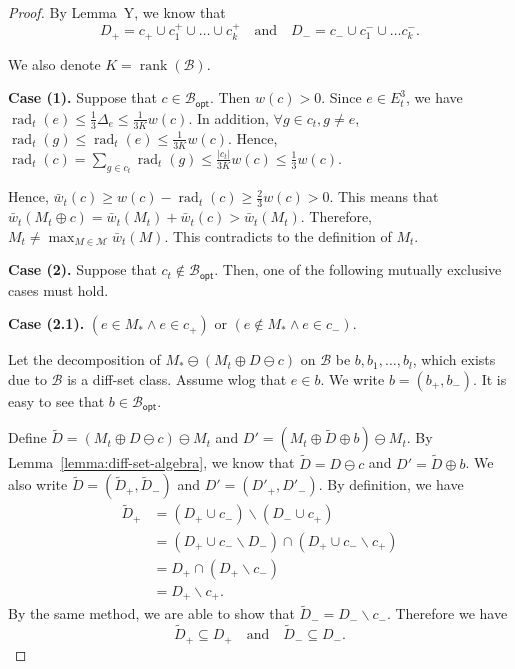 \documentclass{article}
\newcommand{\M}{\mathcal M}
\newcommand{\B}{\mathcal B}
\newcommand{\del}{\backslash}
\newcommand{\Bopt}{\mathcal B_{\mathsf{opt}}}
\DeclareMathOperator{\rank}{rank}
\DeclareMathOperator{\rad}{rad}
\begin{document}
\begin{spacing}{1.1}
\begin{proof}
By Lemma~Y, we know that 
\begin{equation}
	\label{eq:lemma-key-1}
	D_+ = c_+\cup c_1^+ \cup \ldots \cup c_k^+\quad \text{and}\quad D_- = c_-\cup c_1^-\cup \ldots c_k^-.
\end{equation}

We also denote $K=\rank(\B)$.


\textbf{Case (1).} 
Suppose that $c \in\Bopt$. Then $w(c)>0$.
Since $e\in E_t^3$, we have $\rad_t(e) \le \frac{1}{3}\Delta_e \le \frac{1}{3K}w(c)$.
In addition, $\forall g\in c_t, g\not=e$, $\rad_t(g) \le \rad_t(e)\le \frac{1}{3K}w(c)$.
Hence, $\rad_t(c) = \sum_{g\in c_t} \rad_t(g) \le \frac{|c_t|}{3K}w(c) \le \frac{1}{3}w(c)$.

Hence, $\bar w_t(c) \ge w(c)-\rad_t(c) \ge \frac{2}{3}w(c) > 0$.
This means that $\bar w_t(M_t \oplus c) = \bar w_t(M_t)+\bar w_t(c) > \bar w_t(M_t)$.
Therefore, $M_t \not= \max_{M\in \M} \bar w_t(M)$.
This contradicts to the definition of $M_t$.

\textbf{Case (2).} 
Suppose that $c_t\not\in \Bopt$. Then, one of the following mutually exclusive cases must hold.

\textbf{Case (2.1).} 
$(e \in M_* \wedge e\in c_+)$ or $(e \not \in M_* \wedge e\in c_-)$. 
 
Let the decomposition of $M_* \ominus (M_t \oplus D \ominus c)$ on $\B$ be $b,b_1,\ldots,b_l$, which exists due to $\B$ is a diff-set class. 
Assume wlog that $e\in b$. 
We write $b=(b_+,b_-)$.
It is easy to see that $b \in \Bopt$. 

Define $\tilde D = (M_t \oplus D \ominus c)\ominus M_t$ and $D' = (M_t \oplus \tilde D \oplus b) \ominus M_t$.
By Lemma~\ref{lemma:diff-set-algebra}, we know that $\tilde D = D\ominus c$ and $D'=\tilde D\oplus b$.
We also write $\tilde D=(\tilde D_+, \tilde D_-)$ and $D'= (D'_+, D'_-)$.
By definition, we have 
\begin{align*}
	\tilde D_+ &= (D_+ \cup c_-)\del (D_- \cup c_+)\\
	           &= (D_+\cup c_-\del D_-) \cap (D_+\cup c_-\del c_+)\\
	           &= D_+ \cap (D_+\del c_-) \\
	           &= D_+\del c_+.
\end{align*}
By the same method, we are able to show that $\tilde D_-=D_-\del c_-$.
Therefore we have 
\begin{equation}
\label{eq:2.1.0.1}
\tilde D_+\subseteq D_+\quad\text{and}\quad\tilde D_-\subseteq D_-.
\end{equation}


\end{proof}
\end{spacing}
\end{document}
